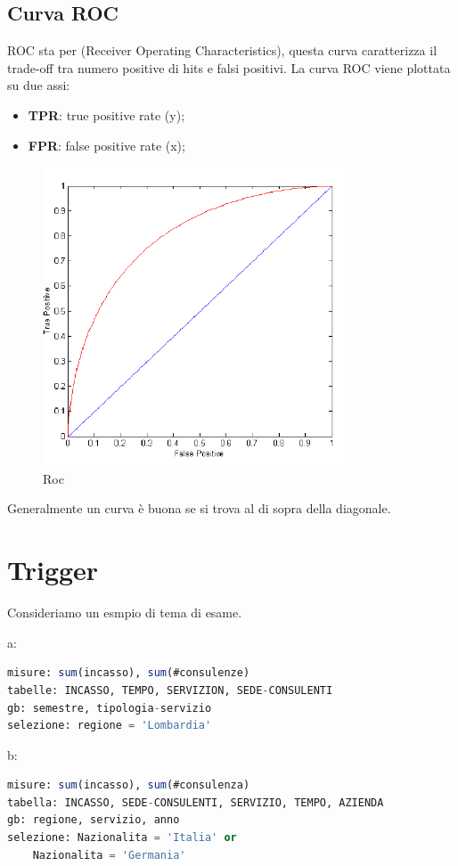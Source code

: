 \documentclass[12pt]{article}
\begin{document}
\subsection{Curva ROC}
ROC sta per (Receiver Operating Characteristics), questa curva caratterizza il trade-off tra numero positive di hits e falsi positivi. La curva ROC viene plottata su due assi:
\begin{itemize}
    \item \textbf{TPR}: true positive rate (y);
    \item \textbf{FPR}: false positive rate (x);
\end{itemize}
\begin{figure}[H]
    \centering
    \includegraphics[width=0.8\textwidth]{roc.png}
    \caption{Roc}
    \label{fig:roc}
\end{figure}
Generalmente un curva \`e buona se si trova al di sopra della diagonale.



\newpage
\section{Trigger}
Consideriamo un esmpio di tema di esame.

a:
\begin{lstlisting}[language=sql]
misure: sum(incasso), sum(#consulenze)
tabelle: INCASSO, TEMPO, SERVIZION, SEDE-CONSULENTI
gb: semestre, tipologia-servizio
selezione: regione = 'Lombardia'
\end{lstlisting}

b:
\begin{lstlisting}[language=sql]
misure: sum(incasso), sum(#consulenza)
tabella: INCASSO, SEDE-CONSULENTI, SERVIZIO, TEMPO, AZIENDA
gb: regione, servizio, anno
selezione: Nazionalita = 'Italia' or
    Nazionalita = 'Germania'
\end{lstlisting}
\end{document}
